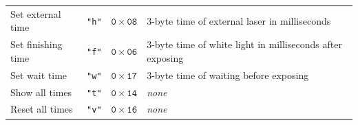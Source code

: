 \documentclass[twoside,project]{../MFFPrace}
\begin{document}
\begin{table}[hp]
\begin{adjustwidth}{-6em}{-3em}
\begin{tabular}{|l|c|c|l|}
            Set external time    & \texttt{"h"}  & $\mathtt{0{\times}08}$ & 3-byte time of external laser in milliseconds             \\
            Set finishing time   & \texttt{"f"}  & $\mathtt{0{\times}06}$ & 3-byte time of white light in milliseconds after exposing \\
            Set wait time        & \texttt{"w"}  & $\mathtt{0{\times}17}$ & 3-byte time of waiting before exposing                    \\
            Show all times       & \texttt{"t"}  & $\mathtt{0{\times}14}$ & \textit{none}                                             \\
            Reset all times      & \texttt{"v"}  & $\mathtt{0{\times}16}$ & \textit{none}                                             \\
            \hline
        \end{tabular}
    \end{adjustwidth}
    \label{tbl:instrukce}
\end{table}
\end{document}
